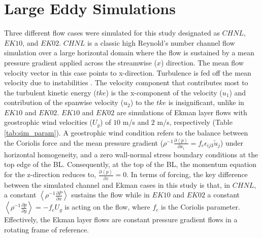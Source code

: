 \section{Large Eddy Simulations}
\label{sec:LES_chap2}
Three different flow cases were simulated for this study designated as $CHNL$, $EK10$, and $EK02$. $CHNL$ is a classic high Reynold's number channel flow simulation over a large horizontal domain where the flow is sustained by a mean pressure gradient applied across the streamwise ($x$) direction. The mean flow velocity vector in this case points to x-direction. Turbulence is fed off the mean velocity due to instabilities \citep{landahl_christensen_book_92}. The velocity component that contributes most to the turbulent kinetic energy ($tke$) is the x-component of the velocity ($u_1$) and contribution of the spanwise velocity ($u_2$) to the $tke$ is insignificant, unlike in $EK10$ and $EK02$. $EK10$ and $EK02$ are simulations of Ekman layer flows with geostrophic wind velocities ($U_g$) of $10$ m/s and $2$ m/s, respectively (Table \ref{tab:sim_param}). A geostrophic wind condition refers to the balance between the Coriolis force and the mean pressure gradient ($\rho^{-1}\frac{\partial \left < p \right >}{\partial x_i} = f_c\epsilon_{ij3}\tilde{u}_j$) under horizontal homogeneity, and a zero wall-normal stress boundary conditions at the top edge of the BL. Consequently, at the top of the BL, the momentum equation for the z-direction reduces to, $\frac{\partial \left < p \right >}{\partial z} = 0$. In terms of forcing, the key difference between the simulated channel and Ekman cases in this study is that, in $CHNL$, a constant $\left < \rho^{-1} \frac{\partial P}{\partial x} \right >$ sustains the flow while in $EK10$ and $EK02$ a constant $\left < \rho^{-1}\frac{\partial p }{\partial y} \right >  = -f_c U_g$ is acting on the flow, where $f_c$ is the Coriolis parameter. Effectively, the Ekman layer flows are constant pressure gradient flows in a rotating frame of reference. 

